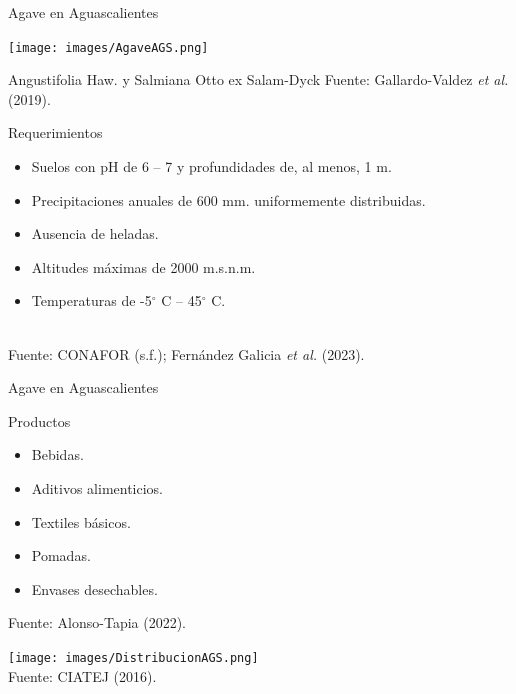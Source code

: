 \documentclass[aspectratio=169]{beamer}
\begin{document}
\begin{frame}{Agave en Aguascalientes}
    \vspace{-1cm}
    \begin{minipage}{0.5\textwidth}
			\hspace{-0.5cm}\texttt{[image: images/AgaveAGS.png]}
		\end{minipage}%
		\begin{minipage}{0.5\textwidth}
			\begin{block}{Angustifolia Haw. y Salmiana Otto ex Salam-Dyck}
				\hfill {\scriptsize Fuente: Gallardo-Valdez \textit{et al.} (2019).}
			\end{block}
            \pause\begin{block}{Requerimientos}
                \begin{itemize}
				\item Suelos con pH de 6 -- 7 y profundidades de, al menos, 1 m.
                    \item Precipitaciones anuales de 600 mm. uniformemente distribuidas.
                    \item Ausencia de heladas.
                    \item Altitudes máximas de 2000 m.s.n.m.
                    \item Temperaturas de -5$^\circ$ C -- 45$^\circ$ C. 
			\end{itemize}
            \end{block}
		\end{minipage}
        \,\\
        \hfill {\scriptsize Fuente: CONAFOR (s.f.);  Fernández Galicia \textit{et al.} (2023).}
\end{frame}


\begin{frame}{Agave en Aguascalientes}
	\vspace{-1cm}
	\begin{minipage}{0.5\textwidth}
		\begin{block}{Productos}
			\begin{itemize}
				\item Bebidas.
				\item Aditivos alimenticios.
				\item Textiles básicos.
				\item Pomadas.
				\item Envases desechables.
			\end{itemize}
			{\scriptsize Fuente: Alonso-Tapia (2022).}
		\end{block}
	\end{minipage}%
	\begin{minipage}{0.5\textwidth}
		\centering\texttt{[image: images/DistribucionAGS.png]}\\\hfill {\scriptsize Fuente: CIATEJ (2016).}
	\end{minipage}%
\end{frame}
\end{document}
